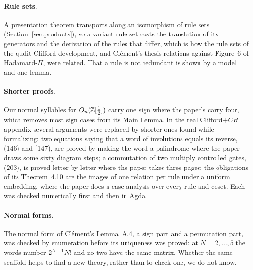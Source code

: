 \paragraph{Rule sets.} A presentation theorem transports along an
isomorphism of rule sets (Section~\ref{sec:products}), so a variant
rule set costs the translation of its generators and the derivation of
the rules that differ, which is how the rule sets of the qudit
Clifford development, and Cl\'ement's thesis relations against
Figure~6 of Hadamard-$\Pi$, were related. That a rule is not
redundant is shown by a model and one lemma.

\paragraph{Shorter proofs.} Our normal syllables for $O_n(\mathbb{Z}[\frac12])$
carry one sign where the paper's carry four, which removes most sign
cases from its Main Lemma. In the real Clifford+$CH$ appendix several
arguments were replaced by shorter ones found while formalizing: two
equations saying that a word of involutions equals its reverse, (146)
and (147), are proved by making the word a palindrome where the paper
draws some sixty diagram steps; a commutation of two multiply
controlled gates, (203), is proved letter by letter where the paper
takes three pages; the obligations of its Theorem~4.10 are the images
of one relation per rule under a uniform embedding, where the paper
does a case analysis over every rule and coset. Each was checked
numerically first and then in Agda.

\paragraph{Normal forms.} The normal form of Cl\'ement's Lemma~A.4, a
sign part and a permutation part, was checked by enumeration before
its uniqueness was proved: at $N=2,\dots,5$ the words number
$2^{N-1}N!$ and no two have the same matrix. Whether the same scaffold
helps to find a new theory, rather than to check one, we do not know.
